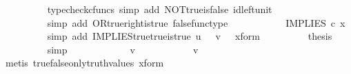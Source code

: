 \begin{isabellebody}
\ \ \ \ \ \ \ \ \isamarkupfalse%
\ {\isacharparenleft}{\kern0pt}typecheck{\isacharunderscore}{\kern0pt}cfuncs{\isacharcomma}{\kern0pt}\ simp\ add{\isacharcolon}{\kern0pt}\ NOT{\isacharunderscore}{\kern0pt}true{\isacharunderscore}{\kern0pt}is{\isacharunderscore}{\kern0pt}false\ id{\isacharunderscore}{\kern0pt}left{\isacharunderscore}{\kern0pt}unit{}{\isacharparenright}{\kern0pt}\isanewline
\ \ \ \ \ \ \isamarkupfalse%
\ \isamarkupfalse%
\ {\isachardoublequoteopen}{\isachardot}{\kern0pt}{\isachardot}{\kern0pt}{\isachardot}{\kern0pt}\ {\isacharequal}{\kern0pt}\ {\isasymt}{\isachardoublequoteclose}\isanewline
\ \ \ \ \ \ \ \ \isamarkupfalse%
\ {\isacharparenleft}{\kern0pt}simp\ add{\isacharcolon}{\kern0pt}\ OR{\isacharunderscore}{\kern0pt}true{\isacharunderscore}{\kern0pt}right{\isacharunderscore}{\kern0pt}is{\isacharunderscore}{\kern0pt}true\ false{\isacharunderscore}{\kern0pt}func{\isacharunderscore}{\kern0pt}type{\isacharparenright}{\kern0pt}\isanewline
\ \ \ \ \ \ \isamarkupfalse%
\ \isamarkupfalse%
\ {\isachardoublequoteopen}{\isachardot}{\kern0pt}{\isachardot}{\kern0pt}{\isachardot}{\kern0pt}\ {\isacharequal}{\kern0pt}\ IMPLIES\ {\isasymcirc}\isactrlsub c\ x{\isachardoublequoteclose}\isanewline
\ \ \ \ \ \ \ \ \isamarkupfalse%
\ {\isacharparenleft}{\kern0pt}simp\ add{\isacharcolon}{\kern0pt}\ IMPLIES{\isacharunderscore}{\kern0pt}true{\isacharunderscore}{\kern0pt}true{\isacharunderscore}{\kern0pt}is{\isacharunderscore}{\kern0pt}true\ {\isacartoucheopen}u\ {\isacharequal}{\kern0pt}\ {\isasymt}{\isacartoucheclose}\ {\isacartoucheopen}v\ {\isacharequal}{\kern0pt}\ {\isasymt}{\isacartoucheclose}\ x{\isacharunderscore}{\kern0pt}form{\isacharparenright}{\kern0pt}\isanewline
\ \ \ \ \ \ \isamarkupfalse%
\ \isamarkupfalse%
\ {\isacharquery}{\kern0pt}thesis\isanewline
\ \ \ \ \ \ \ \ \isamarkupfalse%
\ simp\isanewline
\ \ \ \ \isamarkupfalse%
\isanewline
\ \ \ \ \ \ \isamarkupfalse%
\ {\isachardoublequoteopen}v\ {\isasymnoteq}\ {\isasymt}{\isachardoublequoteclose}\isanewline
\ \ \ \ \ \ \isamarkupfalse%
\ \isamarkupfalse%
\ {\isachardoublequoteopen}v\ {\isacharequal}{\kern0pt}\ {\isasymf}{\isachardoublequoteclose}\isanewline
\ \ \ \ \ \ \ \ \isamarkupfalse%
\ {\isacharparenleft}{\kern0pt}metis\ true{\isacharunderscore}{\kern0pt}false{\isacharunderscore}{\kern0pt}only{\isacharunderscore}{\kern0pt}truth{\isacharunderscore}{\kern0pt}values\ x{\isacharunderscore}{\kern0pt}form{\isacharparenright}{\kern0pt}\isanewline

\end{isabellebody}
